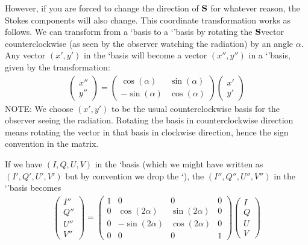 \documentclass[letterpaper,10pt,english]{sphinxmanual}
\begin{document}
However, if you are forced to change the direction of \({\bf S}\) for whatever
reason, the Stokes components will also change. This coordinate transformation
works as follows.
We can transform from a ‘\sphinxhyphen{}basis to a ‘’\sphinxhyphen{}basis by rotating the \({\bf S}\)\sphinxhyphen{}vector
counter\sphinxhyphen{}clockwise (as seen by the observer watching the radiation) by an
angle \(\alpha\). Any vector \((x',y')\) in the ‘\sphinxhyphen{}basis will become a vector
\((x'',y'')\) in a ‘’\sphinxhyphen{}basis, given by the transformation:
\begin{equation*}
\begin{split}\left(\begin{matrix}
x''\\y''
\end{matrix}\right)
=
\left(\begin{matrix}
\cos(\alpha) & \sin(\alpha)\\
-\sin(\alpha) & \cos(\alpha)
\end{matrix}\right)
\left(\begin{matrix}
x'\\y'
\end{matrix}\right)\end{split}
\end{equation*}
NOTE: We choose \((x',y')\) to be the usual counter\sphinxhyphen{}clockwise basis for the
observer seeing the radiation. Rotating the basis in counter\sphinxhyphen{}clockwise direction
means rotating the vector in that basis in clockwise direction, hence the sign
convention in the matrix.

If we have \((I,Q,U,V)\) in the ‘\sphinxhyphen{}basis (which we might have written as
\((I',Q',U',V')\) but by convention we drop the ‘), the
\((I'',Q'',U'',V'')\) in the ‘’\sphinxhyphen{}basis becomes
\begin{equation*}
\begin{split}\left(\begin{matrix}
I''\\Q''\\U''\\V''
\end{matrix}\right)
=
\left(\begin{matrix}
1 & 0 & 0 & 0 \\
0 & \cos(2\alpha) & \sin(2\alpha) & 0 \\
0 & -\sin(2\alpha) & \cos(2\alpha) & 0 \\
0 & 0 & 0 & 1
\end{matrix}\right)
\left(\begin{matrix}
I\\Q\\U\\V
\end{matrix}\right)\end{split}
\end{equation*}
\end{document}
